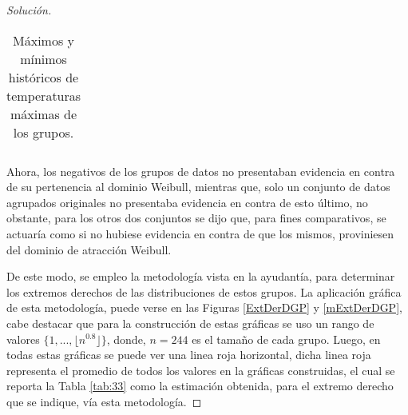 \documentclass[10.5pt,notitlepage]{article}
\newenvironment{solucion}
  {\begin{proof}[Solución]}
  {\end{proof}}
\newcommand{\floor}[1]{\lfloor #1 \rfloor}
\theoremstyle{plain}
\begin{document}
\begin{solucion}
\begin{table}[H]
\begin{tabular}{@{}l@{\hskip 0.3in}r@{\hskip 0.3in}r@{\hskip 0.3in}r@{\hskip 0.3in}r@{\hskip 0.3in}r@{\hskip 0.3in}r@{\hskip 0.3in}r@{\hskip 0.3in}r@{\hskip 0.3in}r@{\hskip 0.3in}r@{\hskip 0.3in}r@{}}
        \end{tabular}
        \caption{Máximos y mínimos históricos de temperaturas máximas de los grupos.}
        \label{tab:e2}
\end{table}
Ahora, los negativos de los grupos de datos no presentaban evidencia en contra de su pertenencia al dominio Weibull, mientras que, solo un conjunto de datos agrupados originales no presentaba evidencia en contra de esto último, no obstante, para los otros dos conjuntos se dijo que, para fines comparativos, se actuaría como si no hubiese evidencia en contra de que los mismos, proviniesen del dominio de atracción Weibull. 


De este modo, se empleo la metodología vista en la ayudantía, para determinar los extremos derechos de las distribuciones de estos grupos. La aplicación gráfica de esta metodología, puede verse en las Figuras \ref{ExtDerDGP} y \ref{mExtDerDGP}, cabe destacar que para la construcción de estas gráficas se uso un rango de valores $\{1, . . . , \floor{n^{0.8}}\}$, donde, $n = 244$ es el tamaño de cada grupo. Luego, en todas estas gráficas se puede ver una linea roja horizontal, dicha linea roja representa el promedio de todos los valores en la gráficas construidas, el cual se reporta la Tabla \ref{tab:33} como la estimación obtenida, para el extremo derecho que se indique, vía esta metodología.
\begin{table}[H]
        \centering
        \caption{Extremos derechos estimados, de temperaturas máximas en Albania por grupo.}
        \label{tab:33}
\end{table}	

\end{solucion}
\end{document}
